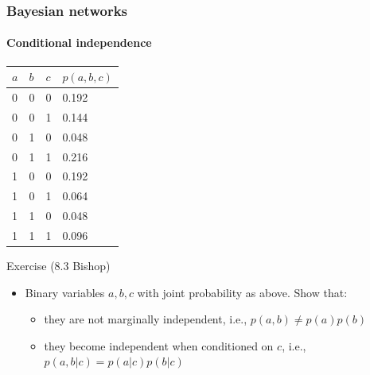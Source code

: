\documentclass[slidestop,compress,mathserif]{beamer}
\begin{document}
\begin{frame}
	\frametitle{Bayesian networks}
	\framesubtitle{Conditional independence}
\centering
\begin{tabular}{l|l|l|l}
$a$ & $b$ & $c$ & $p(a,b,c)$\\ \hline
0   & 0   & 0   & 0.192      \\
0   & 0   & 1   & 0.144      \\
0   & 1   & 0   & 0.048      \\
0   & 1   & 1   & 0.216      \\
1   & 0   & 0   & 0.192      \\
1   & 0   & 1   & 0.064      \\
1   & 1   & 0   & 0.048      \\
1   & 1   & 1   & 0.096     
\end{tabular}
	\begin{block}{Exercise (8.3 Bishop)}
    \begin{itemize}
    \item Binary variables $a,b,c$ with joint probability as above. Show that:
    \begin{itemize}
    	\item they are not marginally independent, i.e., $p(a,b)\neq p(a)p(b)$
    	\item they become independent when conditioned on $c$, i.e., $p(a,b|c) = p(a|c)p(b|c)$
    \end{itemize}
    \end{itemize} 
    \end{block}
\end{frame}
\end{document}

